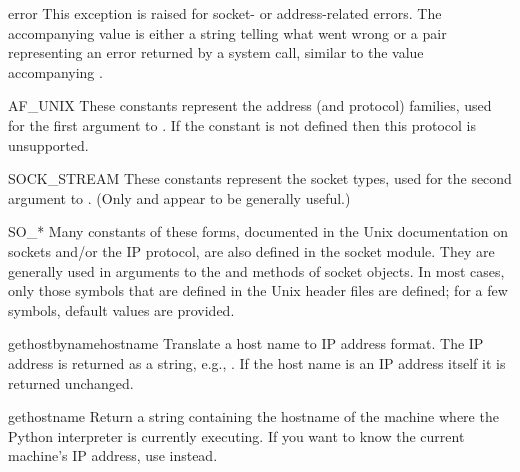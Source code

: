 \renewcommand{\indexsubitem}{(in module socket)}
\begin{excdesc}{error}
This exception is raised for socket- or address-related errors.
The accompanying value is either a string telling what went wrong or a
pair 
representing an error returned by a system
call, similar to the value accompanying .
\end{excdesc}

\begin{datadesc}{AF_UNIX}
These constants represent the address (and protocol) families,
used for the first argument to .  If the 
constant is not defined then this protocol is unsupported.
\end{datadesc}

\begin{datadesc}{SOCK_STREAM}
These constants represent the socket types,
used for the second argument to .
(Only  and
 appear to be generally useful.)
\end{datadesc}

\begin{datadesc}{SO_*}
Many constants of these forms, documented in the Unix documentation on
sockets and/or the IP protocol, are also defined in the socket module.
They are generally used in arguments to the  and
 methods of socket objects.  In most cases, only
those symbols that are defined in the Unix header files are defined;
for a few symbols, default values are provided.
\end{datadesc}

\begin{funcdesc}{gethostbyname}{hostname}
Translate a host name to IP address format.  The IP address is
returned as a string, e.g.,  .  If the host name
is an IP address itself it is returned unchanged.
\end{funcdesc}

\begin{funcdesc}{gethostname}{}
Return a string containing the hostname of the machine where 
the Python interpreter is currently executing.  If you want to know the
current machine's IP address, use
 instead.
\end{funcdesc}

